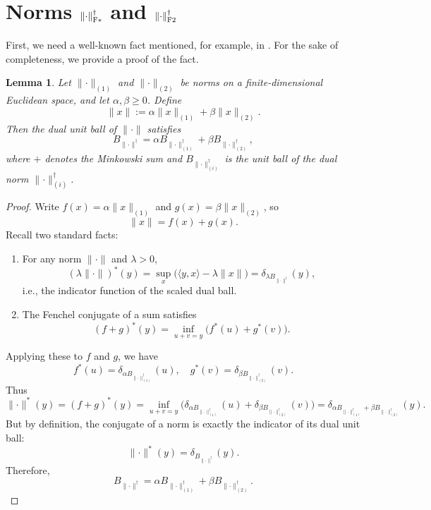 \documentclass{article} %
\newtheorem{lemma}{Lemma}
\newcommand{\norm}[1]{\lVert #1\rVert}
\DeclarePairedDelimiter{\normfstar}{\|}{\|_\mathrm{F*}}
\DeclarePairedDelimiter{\normftwo}{\|}{\|_\mathrm{F2}}
\begin{document}
\section{Norms $\normfstar{\cdot}^\dagger$ and $\normftwo{\cdot}^\dagger$}
First, we need a well-known fact mentioned, for example, in \citet[Table 1]{yu2012arithmetic}. For the sake of completeness, we provide a proof of the fact.

\begin{lemma}\label{lemma:dual_to_conv_comb}
    Let $\norm{\cdot}_{(1)}$ and $\norm{\cdot}_{(2)}$ be norms on a finite-dimensional Euclidean space, and let $\alpha,\beta \geq 0$. Define 
    $$
    \norm{x} := \alpha \norm{x}_{(1)} + \beta \norm{x}_{(2)}.
    $$
    Then the dual unit ball of $\norm{\cdot}$ satisfies
    $$
    B_{\norm{\cdot}^\dagger} 
    = \alpha B_{\norm{\cdot}_{(1)}^\dagger} + \beta B_{\norm{\cdot}_{(2)}^\dagger},
    $$
    where $+$ denotes the Minkowski sum and $B_{\norm{\cdot}_{(i)}^\dagger}$ is the unit ball of the dual norm $\norm{\cdot}_{(i)}^\dagger$.
\end{lemma}
    
    \begin{proof}
    Write $f(x) = \alpha \norm{x}_{(1)}$ and $g(x) = \beta \norm{x}_{(2)}$, so 
    $$
    \norm{x} = f(x)+g(x).
    $$
    Recall two standard facts:
    \begin{enumerate}
        \item For any norm $\norm{\cdot}$ and $\lambda>0$, 
        $$
        (\lambda \norm{\cdot})^*(y) = 
        \sup_{x}\bigl( \langle y,x \rangle - \lambda \norm{x}\bigr)
        = \delta_{\lambda B_{\norm{\cdot}^\dagger}}(y),
        $$
        i.e., the indicator function of the scaled dual ball.
        \item The Fenchel conjugate of a sum satisfies
        $$
        (f+g)^*(y) = \inf_{u+v=y} \bigl(f^*(u) + g^*(v)\bigr).
        $$
    \end{enumerate}
    Applying these to $f$ and $g$, we have 
    $$
    f^*(u) = \delta_{\alpha B_{\norm{\cdot}_{(1)}^\dagger}}(u), 
    \quad 
    g^*(v) = \delta_{\beta B_{\norm{\cdot}_{(2)}^\dagger}}(v).
    $$
    Thus
    $$
    \norm{\cdot}^*(y) 
    = (f+g)^*(y)
    = \inf_{u+v=y}
    \bigl(
    \delta_{\alpha B_{\norm{\cdot}_{(1)}^\dagger}}(u)
    +
    \delta_{\beta B_{\norm{\cdot}_{(2)}^\dagger}}(v)
    \bigr)
    = 
    \delta_{\alpha B_{\norm{\cdot}_{(1)}^\dagger}+\beta B_{\norm{\cdot}_{(2)}^\dagger}}(y).
    $$
    But by definition, the conjugate of a norm is exactly the indicator of its dual unit ball:
    $$
    \norm{\cdot}^*(y) = \delta_{B_{\norm{\cdot}^\dagger}}(y).
    $$
    Therefore,
    $$
    B_{\norm{\cdot}^\dagger} = \alpha B_{\norm{\cdot}_{(1)}^\dagger} + \beta B_{\norm{\cdot}_{(2)}^\dagger}.
    $$
    \end{proof}
\end{document}
